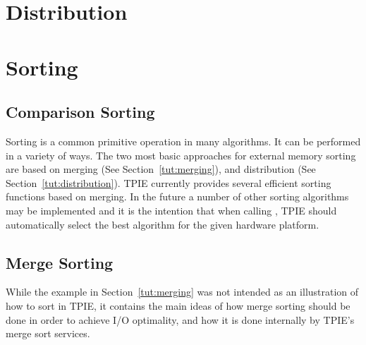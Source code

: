 
\section{Distribution} 

\tobewritten


%


\section{Sorting}

\subsection{Comparison Sorting} 

Sorting is a common primitive operation in many algorithms.
It can be performed in a variety of ways. The two most basic
approaches for external memory sorting are based on merging
(See Section~\ref{tut:merging}), and distribution (See
Section~\ref{tut:distribution}).
TPIE currently provides several efficient sorting functions
based on merging.  In the future a number of other sorting
algorithms may be implemented and it is the intention that
when calling , TPIE should automatically
select the best algorithm for the given hardware platform.

\subsection{Merge Sorting} 
While the  example in
Section~\ref{tut:merging} was not intended as an
illustration of how to sort in TPIE, it contains the main
ideas of how merge sorting should be done in order to
achieve I/O optimality, and how it is done internally by
TPIE's merge sort services.

